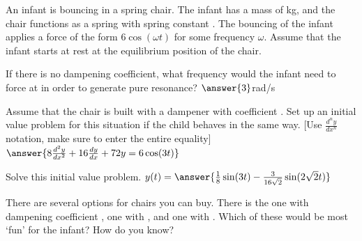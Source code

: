 \documentclass{ximera}
\begin{document}
\begin{exercise}
    An infant is bouncing in a spring chair. The infant has a mass of \unit[8]{kg}, and the chair functions as a spring with spring constant . The bouncing of the infant applies a force of the form $6 \cos(\omega t)$ for some frequency $\omega$. Assume that the infant starts at rest at the equilibrium position of the chair.
    
     If there is no dampening coefficient, what frequency would the infant need to force at in order to generate pure resonance? $\answer{3}$rad/s
    \begin{problem}
        Assume that the chair is built with a dampener with coefficient . Set up an initial value problem for this situation if the child behaves in the same way. [Use $\frac{d^ny}{dx^n}$ notation, make sure to enter the entire equality] $\answer{8\frac{d^2y}{dx^2} + 16\frac{dy}{dx} + 72y = 6\cos(3t)}$
        \begin{problem}
            Solve this initial value problem. $y(t) = \answer{\frac{1}{8}\sin(3t) - \frac{3}{16\sqrt{2}}\sin(2\sqrt{2} t)}$
            \begin{problem}
                There are several options for chairs you can buy. There is the one with dampening coefficient , one with , and one with . Which of these would be most `fun' for the infant? How do you know?
                \begin{multipleChoice}
                \end{multipleChoice}
            \end{problem}
        \end{problem}
    \end{problem}
\end{exercise}
\end{document}

